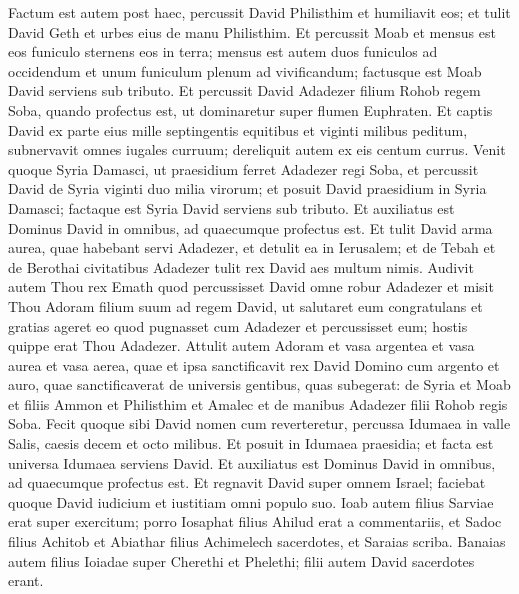 \begin{biblechapter}  
\verse Factum est autem post haec, percussit David Philisthim et humiliavit eos; et tulit David Geth et urbes eius de manu Philisthim. 
\verse Et percussit Moab et mensus est eos funiculo sternens eos in terra; mensus est autem duos funiculos ad occidendum et unum funiculum plenum ad vivificandum; factusque est Moab David serviens sub tributo. 
\verse Et percussit David Adadezer filium Rohob regem Soba, quando profectus est, ut dominaretur super flumen Euphraten. 
\verse Et captis David ex parte eius mille septingentis equitibus et viginti milibus peditum, subnervavit omnes iugales curruum; dereliquit autem ex eis centum currus. 
\verse Venit quoque Syria Damasci, ut praesidium ferret Adadezer regi Soba, et percussit David de Syria viginti duo milia virorum; 
\verse et posuit David praesidium in Syria Damasci; factaque est Syria David serviens sub tributo. Et auxiliatus est Dominus David in omnibus, ad quaecumque profectus est. 
\verse Et tulit David arma aurea, quae habebant servi Adadezer, et detulit ea in Ierusalem; 
\verse et de Tebah et de Berothai civitatibus Adadezer tulit rex David aes multum nimis. 
\verse Audivit autem Thou rex Emath quod percussisset David omne robur Adadezer  
\verse et misit Thou Adoram filium suum ad regem David, ut salutaret eum congratulans et gratias ageret eo quod pugnasset cum Adadezer et percussisset eum; hostis quippe erat Thou Adadezer. Attulit autem Adoram et vasa argentea et vasa aurea et vasa aerea, 
\verse quae et ipsa sanctificavit rex David Domino cum argento et auro, quae sanctificaverat de universis gentibus, quas subegerat:  
\verse de Syria et Moab et filiis Ammon et Philisthim et Amalec et de manibus Adadezer filii Rohob regis Soba. 
\verse Fecit quoque sibi David nomen cum reverteretur, percussa Idumaea in valle Salis, caesis decem et octo milibus. 
\verse Et posuit in Idumaea praesidia; et facta est universa Idumaea serviens David. Et auxiliatus est Dominus David in omnibus, ad quaecumque profectus est. 
\verse Et regnavit David super omnem Israel; faciebat quoque David iudicium et iustitiam omni populo suo. 
\verse Ioab autem filius Sarviae erat super exercitum; porro Iosaphat filius Ahilud erat a commentariis, 
\verse et Sadoc filius Achitob et Abiathar filius Achimelech sacerdotes, et Saraias scriba.  
\verse Banaias autem filius Ioiadae super Cherethi et Phelethi; filii autem David sacerdotes erant. 
\end{biblechapter}

